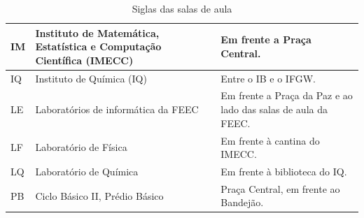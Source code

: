 \begin{table}[ht!]
\begin{tabular}{|l|p{6cm}|p{8cm}|}
        IM  &  Instituto de Matemática, Estatística e Computação Científica (IMECC)  &  Em frente a Praça Central.\\ \hline

        IQ  &  Instituto de Química (IQ)  &  Entre o IB e o IFGW.\\ \hline

        LE  &  Laboratórios de informática da FEEC  &  Em frente a Praça da Paz e ao lado das salas de aula da FEEC.\\ \hline

        LF  &  Laboratório de Física  &  Em frente à cantina do IMECC.\\ \hline

        LQ  &  Laboratório de Química  &  Em frente à biblioteca do IQ.\\ \hline

        PB  &  Ciclo Básico II, Prédio Básico  &  Praça Central, em frente ao Bandejão.\\ \hline
    \end{tabular}
    \caption{Siglas das salas de aula}
    \label{tab:institutos}
\end{table}
